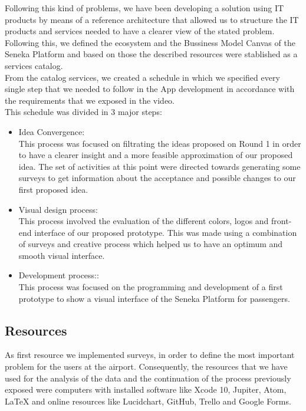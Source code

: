 \documentclass[12pt]{article}
\begin{document}
Following this kind of problems, we have been developing a solution using IT products by means of a reference architecture that allowed us to structure the IT products and services needed to have a clearer view of the stated problem.\\

Following this, we defined the ecosystem and the Bussiness Model Canvas of the Seneka Platform and based on those the described resources were stablished as a services catalog.\\

From the catalog services, we created a schedule in which we specified every single step that we needed to follow in the App development in accordance with the requirements that we exposed in the video.\\

This schedule was divided in 3 major steps:
\begin{itemize}
\item Idea Convergence:\\
This process was focused on filtrating the ideas proposed on Round 1 in order to have a clearer insight and a more feasible approximation of our proposed idea. The set of activities at this point were directed towards generating some surveys to get information about the acceptance and possible changes to our first proposed idea.
\item Visual design process:\\
This process involved the evaluation of the different colors, logos and front-end interface of our proposed prototype. This was made using a combination of surveys and creative process which helped us to have an optimum and smooth visual interface.
\item Development process::\\
This process was focused on the programming and development of a first prototype to show a visual interface of the Seneka Platform for passengers.

\end{itemize}


\subsection{Resources}

As first resource we implemented surveys, in order to define the most important problem for the users at the airport. Consequently,  the resources that we have used for the analysis of the data and the continuation of the process previously exposed were computers with installed software like Xcode 10, Jupiter, Atom, LaTeX and online resources like Lucidchart, GitHub, Trello and Google Forms.\\  
\end{document}
